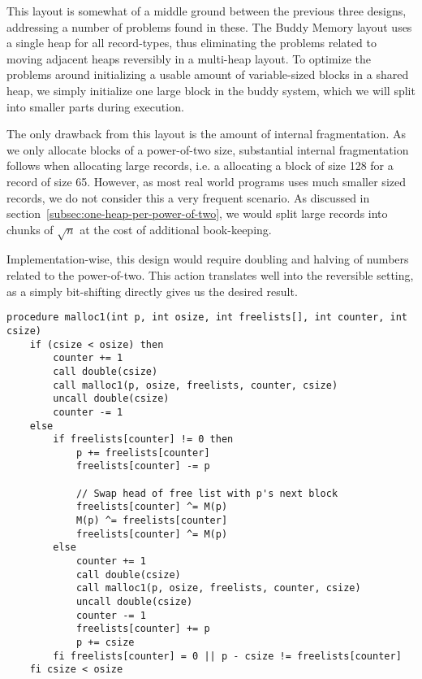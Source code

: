 This layout is somewhat of a middle ground between the previous three designs, addressing a number of problems found in these. The Buddy Memory layout uses a single heap for all record-types, thus eliminating the problems related to moving adjacent heaps reversibly in a multi-heap layout. To optimize the problems around initializing a usable amount of variable-sized blocks in a shared heap, we simply initialize one large block in the buddy system, which we will split into smaller parts during execution.

The only drawback from this layout is the amount of internal fragmentation. As we only allocate blocks of a power-of-two size, substantial internal fragmentation follows when allocating large records, i.e. a allocating a block of size 128 for a record of size 65. However, as most real world programs uses much smaller sized records, we do not consider this a very frequent scenario. As discussed in section~\ref{subsec:one-heap-per-power-of-two}, we would split large records into chunks of $\sqrt{n}$ at the cost of additional book-keeping.

Implementation-wise, this design would require doubling and halving of numbers related to the power-of-two. This action translates well into the reversible setting, as a simply bit-shifting directly gives us the desired result.\\

\begin{lstlisting}[caption={The Buddy Memory algorithm implemented in extended Janus.}, language=janus, style=basic, label={lst:buddy-memory}]
  procedure malloc1(int p, int osize, int freelists[], int counter, int csize)
    if (csize < osize) then
        counter += 1
        call double(csize)
        call malloc1(p, osize, freelists, counter, csize) 
        uncall double(csize)
        counter -= 1
    else
        if freelists[counter] != 0 then
            p += freelists[counter]
            freelists[counter] -= p

            // Swap head of free list with p's next block
            freelists[counter] ^= M(p)
            M(p) ^= freelists[counter]
            freelists[counter] ^= M(p)
        else
            counter += 1
            call double(csize)
            call malloc1(p, osize, freelists, counter, csize)
            uncall double(csize)
            counter -= 1
            freelists[counter] += p
            p += csize
        fi freelists[counter] = 0 || p - csize != freelists[counter]
    fi csize < osize   
\end{lstlisting}

